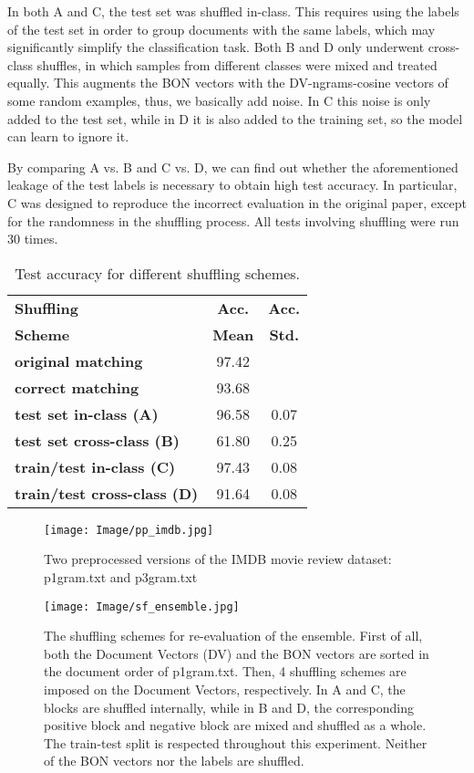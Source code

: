 \documentclass[11pt]{article}
\begin{document}
In both A and C, the test set was shuffled in-class. This requires using the labels of the test set in order to group documents with the same labels, which may significantly simplify the classification task. Both B and D only underwent cross-class shuffles, in which samples from different classes were mixed and treated equally. This augments the BON vectors with the DV-ngrams-cosine vectors of some random examples, thus, we basically add noise. In C this noise is only added to the test set, while in D it is also added to the training set, so the model can learn to ignore it. 

By comparing A vs. B and C vs. D, we can find out whether the aforementioned leakage of the test labels is necessary to obtain high test accuracy. In particular, C was designed to reproduce the incorrect evaluation in the original paper, except for the randomness in the shuffling process. All tests involving shuffling were run 30 times. 

\begin{table}
\centering
\begin{tabular}{lcc}
\hline
\textbf{Shuffling} & \textbf{Acc.} & \textbf{Acc.}\\
\textbf{Scheme} & \textbf{Mean} & \textbf{Std.}\\
\hline
\textbf{original matching} & 97.42 &  \\
\textbf{correct matching} & 93.68 &  \\
\textbf{test set in-class (A)} & 96.58 & 0.07 \\
\textbf{test set cross-class (B)} & 61.80 & 0.25 \\
\textbf{train/test in-class (C)} & 97.43 & 0.08 \\
\textbf{train/test cross-class (D)} & 91.64 & 0.08 \\
\hline
\end{tabular}
\caption{Test accuracy for different shuffling schemes.}
\label{tab:re}
\end{table}

\begin{figure*}[t] \centering \texttt{[image: Image/pp\_imdb.jpg]} 
    \caption{Two preprocessed versions of the IMDB movie review dataset: p1gram.txt and p3gram.txt}
    \label{fig:ppd}
\end{figure*}

\begin{figure*}[t]
    \centering \texttt{[image: Image/sf\_ensemble.jpg]} 
    \caption{The shuffling schemes for re-evaluation of the ensemble. First of all, both the Document Vectors (DV) and the BON vectors are sorted in the document order of p1gram.txt. Then, 4 shuffling schemes are imposed on the Document Vectors, respectively. In A and C, the blocks are shuffled internally, while in B and D, the corresponding positive block and negative block are mixed and shuffled as a whole. The train-test split is respected throughout this experiment. Neither of the BON vectors nor the labels are shuffled.}
    \label{fig:sf_ens}
\end{figure*}
\end{document}
